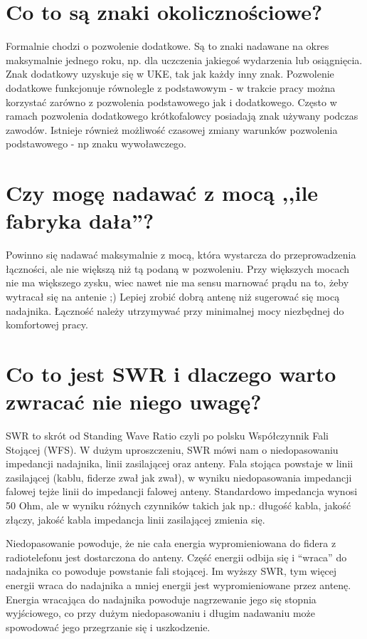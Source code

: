 \documentclass[a4paper,12pt]{article}
\begin{document}
\section{Co to są znaki okolicznościowe?}
Formalnie chodzi o pozwolenie dodatkowe. Są to znaki nadawane na okres maksymalnie jednego roku, np. dla uczczenia jakiegoś wydarzenia lub osiągnięcia. Znak dodatkowy uzyskuje się w UKE, tak jak każdy inny znak. Pozwolenie dodatkowe funkcjonuje równolegle z podstawowym - w trakcie pracy można korzystać zarówno z pozwolenia podstawowego jak i dodatkowego. Często w ramach pozwolenia dodatkowego krótkofalowcy posiadają znak używany podczas zawodów. Istnieje również możliwość czasowej zmiany warunków pozwolenia podstawowego - np znaku wywoławczego. 

\section{Czy mogę nadawać z mocą ,,ile fabryka dała''?}
Powinno się nadawać maksymalnie z mocą, która wystarcza do przeprowadzenia łączności, ale nie większą niż tą podaną w pozwoleniu. Przy większych mocach nie ma większego zysku, wiec nawet nie ma sensu marnować prądu na to, żeby wytracał się na antenie ;) Lepiej zrobić dobrą antenę niż sugerować się mocą nadajnika.
Łączność należy utrzymywać przy minimalnej mocy niezbędnej do komfortowej pracy. 

\section{Co to jest SWR i dlaczego warto zwracać nie niego uwagę?}
SWR to skrót od Standing Wave Ratio czyli po polsku Współczynnik Fali Stojącej (WFS). W dużym uproszczeniu, SWR mówi nam o niedopasowaniu impedancji nadajnika, linii zasilającej oraz anteny. Fala stojąca powstaje w linii zasilającej (kablu, fiderze zwał jak zwał), w wyniku niedopasowania impedancji falowej tejże linii do impedancji falowej anteny. Standardowo impedancja wynosi 50 Ohm, ale w wyniku różnych czynników takich jak np.: długość kabla, jakość złączy, jakość kabla impedancja linii zasilającej zmienia się. 

Niedopasowanie powoduje, że nie cała energia wypromieniowana do fidera z radiotelefonu jest dostarczona do anteny. Część energii odbija się i “wraca” do nadajnika co powoduje powstanie fali stojącej. Im wyższy SWR, tym więcej energii wraca do nadajnika a mniej energii jest wypromieniowane przez antenę. Energia wracająca do nadajnika powoduje nagrzewanie jego się stopnia wyjściowego, co przy dużym niedopasowaniu i długim nadawaniu może spowodować jego przegrzanie się i uszkodzenie.
\end{document}
